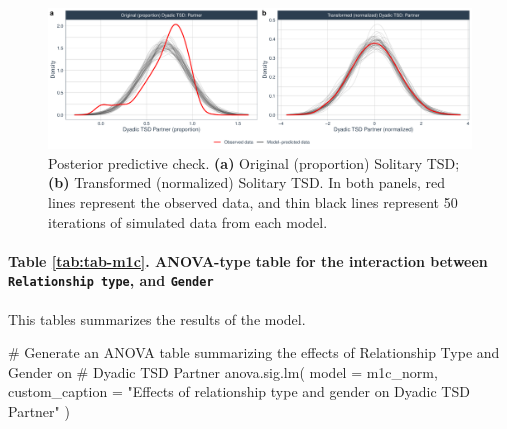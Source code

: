 \documentclass[
  bookmarksnumbered]{article}
\newenvironment{Shaded}{\begin{snugshade}}{\end{snugshade}}
\newcommand{\AttributeTok}[1]{\textcolor[rgb]{0.80,0.80,0.80}{#1}}
\newcommand{\CommentTok}[1]{\textcolor[rgb]{0.50,0.62,0.50}{#1}}
\newcommand{\FunctionTok}[1]{\textcolor[rgb]{0.94,0.94,0.56}{#1}}
\newcommand{\NormalTok}[1]{\textcolor[rgb]{0.80,0.80,0.80}{#1}}
\newcommand{\StringTok}[1]{\textcolor[rgb]{0.80,0.58,0.58}{#1}}
\begin{document}
\begin{figure}
\centering
\includegraphics{Sexual_Desire_Arousal_anonymous_files/figure-latex/ppc-m1c-1.pdf}
\caption{\label{fig:ppc-m1c}Posterior predictive check. \textbf{(a)} Original (proportion) Solitary TSD; \textbf{(b)} Transformed (normalized) Solitary TSD. In both panels, red lines represent the observed data, and thin black lines represent 50 iterations of simulated data from each model.}
\end{figure}

\paragraph{\texorpdfstring{Table \ref{tab:tab-m1c}. ANOVA-type table for the interaction between \texttt{Relationship\ type}, and \texttt{Gender}}{Table \ref{tab:tab-m1c}. ANOVA-type table for the interaction between Relationship type, and Gender}}\label{table-reftabtab-m1c.-anova-type-table-for-the-interaction-between-relationship-type-and-gender}

This tables summarizes the results of the model.

\begin{Shaded}
\begin{Highlighting}[]
\CommentTok{\# Generate an ANOVA table summarizing the effects of Relationship Type and Gender on}
\CommentTok{\# Dyadic TSD Partner}
\FunctionTok{anova.sig.lm}\NormalTok{(}
  \AttributeTok{model =}\NormalTok{ m1c\_norm,}
  \AttributeTok{custom\_caption =} \StringTok{"Effects of relationship type and gender on Dyadic TSD Partner"}
\NormalTok{)}
\end{Highlighting}
\end{Shaded}
\end{document}
